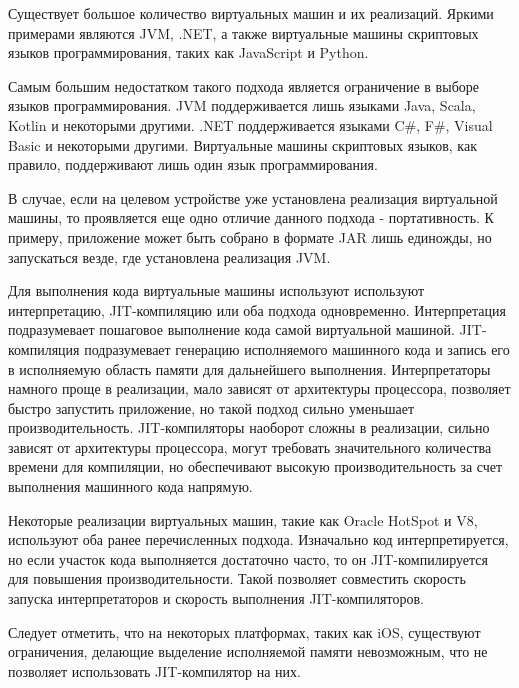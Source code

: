 Существует большое количество виртуальных машин и их реализаций.
Яркими примерами являются JVM, .NET, а также виртуальные машины скриптовых языков программирования, таких как JavaScript и Python.

Самым большим недостатком такого подхода является ограничение в выборе языков программирования. 
JVM поддерживается лишь языками Java, Scala, Kotlin и некоторыми другими. 
.NET поддерживается языками C\#, F\#, Visual Basic и некоторыми другими. 
Виртуальные машины скриптовых языков, как правило, поддерживают лишь один язык программирования.

В случае, если на целевом устройстве уже установлена реализация виртуальной машины, то проявляется еще одно отличие данного подхода - портативность. 
К примеру, приложение может быть собрано в формате JAR лишь единожды, но запускаться везде, где установлена реализация JVM.

Для выполнения кода виртуальные машины используют используют интерпретацию, JIT-компиляцию или оба подхода одновременно.
Интерпретация подразумевает пошаговое выполнение кода самой виртуальной машиной.
JIT-компиляция подразумевает генерацию исполняемого машинного кода и запись его в исполняемую область памяти для дальнейшего выполнения.
Интерпретаторы намного проще в реализации, мало зависят от архитектуры процессора, позволяет быстро запустить приложение, но такой подход сильно уменьшает производительность.
JIT-компиляторы наоборот сложны в реализации, сильно зависят от архитектуры процессора, могут требовать значительного количества времени для компиляции, но обеспечивают высокую производительность за счет выполнения машинного кода напрямую.

Некоторые реализации виртуальных машин, такие как Oracle HotSpot и V8, используют оба  ранее перечисленных подхода. 
Изначально код интерпретируется, но если участок кода выполняется достаточно часто, то он JIT-компилируется для повышения производительности. 
Такой позволяет совместить скорость запуска интерпретаторов и скорость выполнения JIT-компиляторов.

Следует отметить, что на некоторых платформах, таких как iOS, существуют ограничения, делающие выделение исполняемой памяти невозможным, что не позволяет использовать JIT-компилятор на них.
